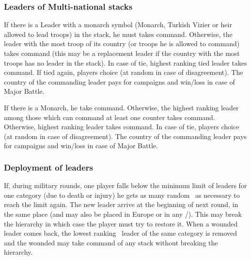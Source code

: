 \subsubsection{Leaders of Multi-national stacks}\label{chMilitary:multi national}
\aparag[On land]
\bparag If there is a Leader with a monarch symbol (Monarch, Turkish Vizier or
heir allowed to lead troops) in the stack, he must takes command.
\bparag Otherwise, the leader with the most troop of its country (or troops he
is allowed to command) takes command (this may be a replacement leader if the
country with the most troops has no leader in the stack).
\bparag In case of tie, highest ranking tied leader takes command.
\bparag If tied again, players choice (at random in case of disagreement).
\bparag The country of the commanding leader pays for campaigns and win/loss
\STAB in case of Major Battle.

\aparag[At sea]
\bparag If there is a Monarch, he take command.
\bparag Otherwise, the highest ranking leader among those which can command at
least one \FLEET counter takes command.
\bparag Otherwise, highest ranking leader takes command.
\bparag In case of tie, players choice (at random in case of disagreement).
\bparag The country of the commanding leader pays for campaigns and win/loss
\STAB in case of Major Battle.

\subsubsection{Deployment of leaders}%


\bparag If, during military rounds, one player falls below the minimum limit
of leaders for one category (due to death or injury) he gets as many random
\anonyme\ as necessary to reach the limit again.
\bparag The new leader arrive at the beginning of next round, in the same
place (\LeaderE and \LeaderC may also be placed in Europe or in any
\COL/\TP).
\bparag This may break the hierarchy in which case the player must try to
restore it.
\bparag When a wounded leader comes back, the lowest ranking \anonyme\ leader
of the same category is removed and the wounded may take command of any stack
without breaking the hierarchy.

